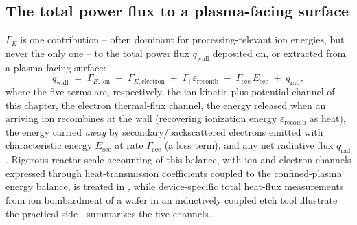 \subsection{The total power flux to a plasma-facing surface}

$\Gamma_{E}$ is one contribution -- often dominant for processing-relevant ion energies, but never the only one -- to the total power flux $q_{\mathrm{wall}}$ deposited on, or extracted from, a plasma-facing surface:
\begin{equation}
q_{\mathrm{wall}} \;=\; \Gamma_{E,\mathrm{ion}} \;+\; \Gamma_{E,\mathrm{electron}} \;+\; \Gamma_{\mathrm{i}}\, \varepsilon_{\mathrm{recomb}} \;-\; \Gamma_{\mathrm{see}}\, E_{\mathrm{see}} \;+\; q_{\mathrm{rad}},
\label{eq:power-balance-total}
\end{equation}
where the five terms are, respectively, the ion kinetic-plus-potential channel of this chapter, the electron thermal-flux channel, the energy released when an arriving ion recombines at the wall (recovering ionization energy $\varepsilon_{\mathrm{recomb}}$ as heat), the energy carried \emph{away} by secondary/backscattered electrons emitted with characteristic energy $E_{\mathrm{see}}$ at rate $\Gamma_{\mathrm{see}}$ (a loss term), and any net radiative flux $q_{\mathrm{rad}}$. Rigorous reactor-scale accounting of this balance, with ion and electron channels expressed through heat-transmission coefficients coupled to the confined-plasma energy balance, is treated in \cite{ref0093}, while device-specific total heat-flux measurements from ion bombardment of a wafer in an inductively coupled etch tool illustrate the practical side \cite{ref0080}.  summarizes the five channels.

